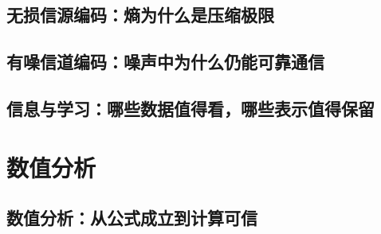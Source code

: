 \documentclass[UTF8,openany]{ctexbook}
\theoremstyle{definition}
\theoremstyle{plain}
\begin{document}
\chapter*{无损信源编码：熵为什么是压缩极限}
\label{ch:057}







\clearpage
\chapter*{有噪信道编码：噪声中为什么仍能可靠通信}
\label{ch:058}





\clearpage
\chapter*{信息与学习：哪些数据值得看，哪些表示值得保留}
\label{ch:059}





\clearpage
\part{数值分析}
\chapter*{数值分析：从公式成立到计算可信}
\label{ch:060}

\clearpage
\end{document}
